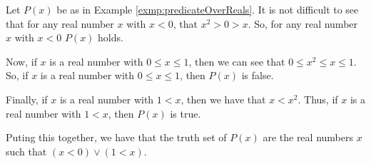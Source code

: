 \guard




\begin{exmp}
\label{exmp:truthSetOverReals}
  Let $P(x)$ be as in Example \ref{exmp:predicateOverReals}.
  It is not difficult to see that for any real number $x$ with $x<0$, that ${x^2>0>x}$.
  So, for any real number $x$ with $x<0$ $P(x)$ holds.

  Now, if $x$ is a real number with ${0\leq x\leq 1}$, then we can see that ${0\leq x^2\leq x\leq 1}$.
  So, if $x$ is a real number with ${0\leq x\leq 1}$, then $P(x)$ is false.

  Finally, if $x$ is a real number with ${1 < x}$, then we have that ${x < x^2}$.
  Thus, if $x$ is a real number with $1<x$, then $P(x)$ is true.

  Puting this together, we have that the truth set of $P(x)$ are the real numbers $x$ such that $(x<0)\vee(1<x)$.
\end{exmp}
